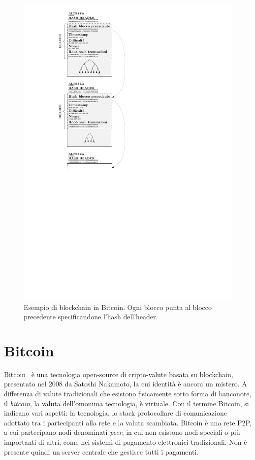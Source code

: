\begin{figure}
	\centering
	\includegraphics[]{img/capuno/blockchain_bitcoin.pdf}
	\caption{Esempio di blockchain in Bitcoin. Ogni blocco punta al blocco precedente specificandone l'hash dell'header.}
	\label{fig:bitcoin_blockchain}
\end{figure}


\section{Bitcoin}
Bitcoin~\cite{nakamoto2019bitcoin} è una tecnologia open-source di cripto-valute basata su blockchain, presentato nel 2008 da Satoshi Nakamoto, la cui identità è ancora un mistero.
A differenza di valute tradizionali che esistono fisicamente sotto forma di banconote, il \textit{bitcoin}, la valuta dell'omonima tecnologia, è virtuale. Con il termine Bitcoin, si indicano vari aspetti: la tecnologia, lo stack protocollare di comunicazione adottato tra i partecipanti alla rete e la valuta scambiata.
Bitcoin è una rete P2P, a cui partecipano nodi denominati \emph{peer}, in cui non esistono nodi speciali o più importanti di altri, come nei sistemi di pagamento elettronici tradizionali. Non è presente quindi un server centrale che gestisce tutti i pagamenti.

